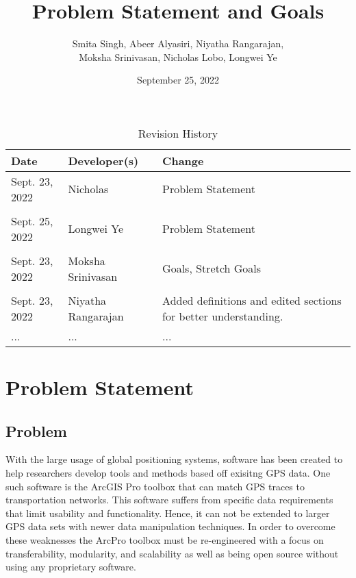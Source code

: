 \documentclass{article}
\title{Problem Statement and Goals\\\progname}
\author{Smita Singh, Abeer Alyasiri, Niyatha Rangarajan,\\ Moksha Srinivasan, Nicholas Lobo, Longwei Ye}
\date{}
\date{September 25, 2022}
\begin{document}
\maketitle

\begin{table}[hp]
\caption{Revision History} \label{TblRevisionHistory}
\begin{tabularx}{\textwidth}{llX}
\toprule
\textbf{Date} & \textbf{Developer(s)} & \textbf{Change}\\
\midrule
Sept. 23, 2022 & Nicholas & Problem Statement\\\\
Sept. 25, 2022 & Longwei Ye & Problem Statement\\\\
Sept. 23, 2022 & Moksha Srinivasan & Goals, Stretch Goals\\\\
Sept. 23, 2022 & Niyatha Rangarajan & Added definitions and edited sections for better understanding.\\
... & ... & ...\\
\bottomrule
\end{tabularx}
\end{table}
\newpage
\section{Problem Statement}



\subsection{Problem}
With the large usage of global positioning systems, software has been created to help researchers develop tools and methods based off exisitng GPS data. 
One such software is the ArcGIS Pro toolbox that can match GPS traces to transportation networks. This software suffers from specific data requirements that limit usability and functionality. Hence, it can not be extended to larger GPS data sets with newer data manipulation techniques. In order to overcome these weaknesses the ArcPro toolbox must be re-engineered with a focus 
on transferability, modularity, and scalability as well as being open source without using any proprietary software. 
\end{document}
